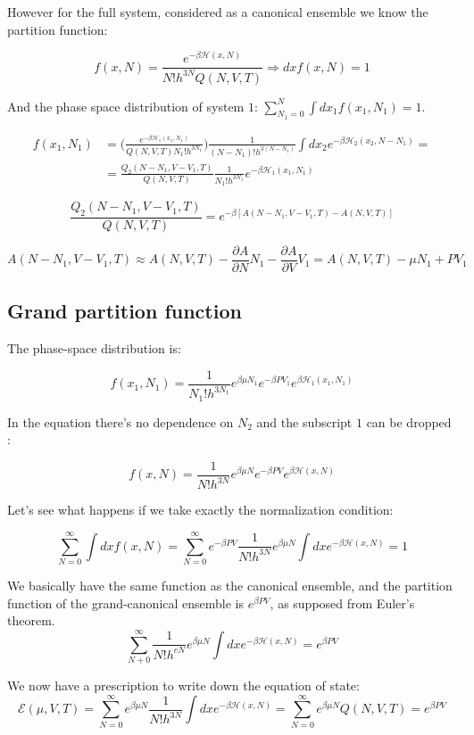 However for the full system, considered as a canonical ensemble we know the partition function:

$$f(x, N) = \frac{e^{-\beta\mathcal{H}(x, N)}}{N!h^{3N}Q(N, V, T)}\Rightarrow dxf(x, N) = 1$$

And the phase space distribution of system $1$: $\sum\limits_{N_1=0}^{N}\int dx_1f(x_1, N_1) = 1$.

\begin{align*}
	f(x_1, N_1) &=\biggl(\frac{e^{-\beta\mathcal{H}_1(x_1, N_1)}}{Q(N, V, T)N_1!h^{3N_1}}\biggr)\frac{1}{(N-N_1)!h^{3(N-N_1)}}\int dx_2e^{-\beta\mathcal{H}_2(x_2, N-N_1)} = \\
							&= \frac{Q_2(N-N_1, V-V_1, T)}{Q(N, V, T)}\frac{1}{N_1!h^{3N_1}}e^{-\beta\mathcal{H}_1(x_1, N_1)}
\end{align*}

$$\frac{Q_2(N-N_1, V-V_1, T)}{Q(N, V, T)} = e^{-\beta[A(N-N_1, V-V_1, T) - A(N, V, T)]}$$

$$A(N-N_1, V-V_1, T)\approx A(N, V, T) -\frac{\partial A}{\partial N}N_1-\frac{\partial A}{\partial V}V_1 = A(N, V, T)-\mu N_1 + PV_1$$


	\subsection{Grand partition function}
	
	The phase-space distribution is:

	$$f(x_1, N_1) = \frac{1}{N_1!h^{3N_1}}e^{\beta\mu N_1}e^{-\beta PV_1}e^{\beta\mathcal{H}_1(x_1, N_1)}$$
	
	In the equation there's no dependence on $N_2$ and the subscript $1$ can be dropped :

	$$f(x, N) = \frac{1}{N!h^{3N}}e^{\beta\mu N}e^{-\beta PV}e^{\beta\mathcal{H}(x, N)}$$

	Let's see what happens if we take exactly the normalization condition:

	$$\sum\limits_{N=0}^{\infty}\int dxf(x, N) = \sum\limits_{N=0}^{\infty}e^{-\beta PV}\frac{1}{N!h^{3N}}e^{\beta\mu N}\int dxe^{-\beta\mathcal{H}(x, N)} = 1$$

We basically have the same function as the canonical ensemble, and the partition function of the grand-canonical ensemble is $e^{\beta PV}$, as supposed from Euler's theorem.
	$$\sum\limits_{N+0}^{\infty}\frac{1}{N!h^{eN }}e^{\beta\mu N}\int dxe^{-\beta\mathcal{H}(x, N)} = e^{\beta PV}$$

We now have a prescription to write down the equation of state:
	$$\mathcal{E}(\mu, V, T) = \sum\limits_{N=0}^{\infty}e^{\beta\mu N}\frac{1}{N!h^{3N}}\int dxe^{-\beta\mathcal{H}(x, N)} = \sum\limits_{N=0}^{\infty}e^{\beta\mu N}Q(N, V, T) = e^{\beta PV}$$

